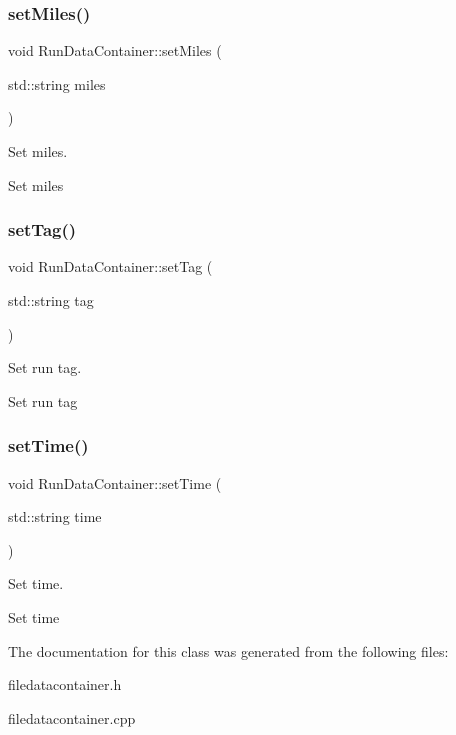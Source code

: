 \subsubsection{\texorpdfstring{setMiles()}{setMiles()}}
{\footnotesize\ttfamily void Run\+Data\+Container\+::set\+Miles (\begin{DoxyParamCaption}\item[{std\+::string}]{miles }\end{DoxyParamCaption})}



Set miles. 

Set miles \mbox{\label{classRunDataContainer_adea33b489fa230a0d1c37fbdb5f0227b}} 
\subsubsection{\texorpdfstring{setTag()}{setTag()}}
{\footnotesize\ttfamily void Run\+Data\+Container\+::set\+Tag (\begin{DoxyParamCaption}\item[{std\+::string}]{tag }\end{DoxyParamCaption})}



Set run tag. 

Set run tag \mbox{\label{classRunDataContainer_a4058969b76c364e84ab19d85b9bb3df4}} 
\subsubsection{\texorpdfstring{setTime()}{setTime()}}
{\footnotesize\ttfamily void Run\+Data\+Container\+::set\+Time (\begin{DoxyParamCaption}\item[{std\+::string}]{time }\end{DoxyParamCaption})}



Set time. 

Set time 

The documentation for this class was generated from the following files\+:\begin{DoxyCompactItemize}
\item 
filedatacontainer.\+h\item 
filedatacontainer.\+cpp\end{DoxyCompactItemize}
